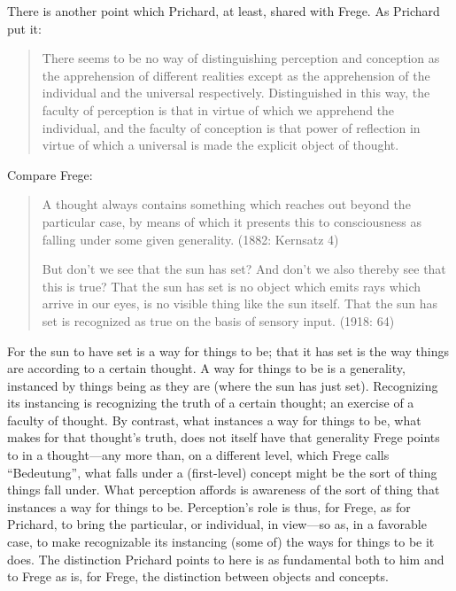 There is another point which Prichard, at least, shared with Frege. As Prichard put it:
\begin{quote}
	There seems to be no way of distinguishing perception and conception as the apprehension of different realities except as the apprehension of the individual and the universal respectively. Distinguished in this way, the faculty of perception is that in virtue of which we apprehend the individual, and the faculty of conception is that power of reflection in virtue of which a universal is made the explicit object of thought. \citep[44]{Prichard:1909yg}
\end{quote}
Compare Frege:
\begin{quote}
	\noindent A thought always contains something which reaches out beyond the particular case, by means of which it presents this to consciousness as falling under some given generality. (1882: Kernsatz 4)
	
	\noindent But don't we see that the sun has set? And don’t we also thereby see that this is true? That the sun has set is no object which emits rays which arrive in our eyes, is no visible thing like the sun itself. That the sun has set is recognized as true on the basis of sensory input. (1918: 64)
\end{quote}
For the sun to have set is a way for things to be; that it has set is the way things are according to a certain thought. A way for things to be is a generality, instanced by things being as they are (where the sun has just set). Recognizing its instancing is recognizing the truth of a certain thought; an exercise of a faculty of thought. By contrast, what instances a way for things to be, what makes for that thought's truth, does not itself have that generality Frege points to in a thought---any more than, on a different level, which Frege calls ``Bedeutung'', what falls under a (first-level) concept might be the sort of thing things fall under. What perception affords is awareness of the sort of thing that instances a way for things to be. Perception's role is thus, for Frege, as for Prichard, to bring the particular, or individual, in view---so as, in a favorable case, to make recognizable its instancing (some of) the ways for things to be it does. The distinction Prichard points to here is as fundamental both to him and to Frege as is, for Frege, the distinction between objects and concepts.

